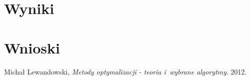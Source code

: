 \documentclass{classrep}
\begin{document}
\section{Wyniki}
	
\section{Wnioski}

\begin{thebibliography}{9}
	Michał Lewandowski,  \emph{Metody optymalizacji - teoria i~wybrane algorytmy}.  2012.
\end{thebibliography}
\end{document}
